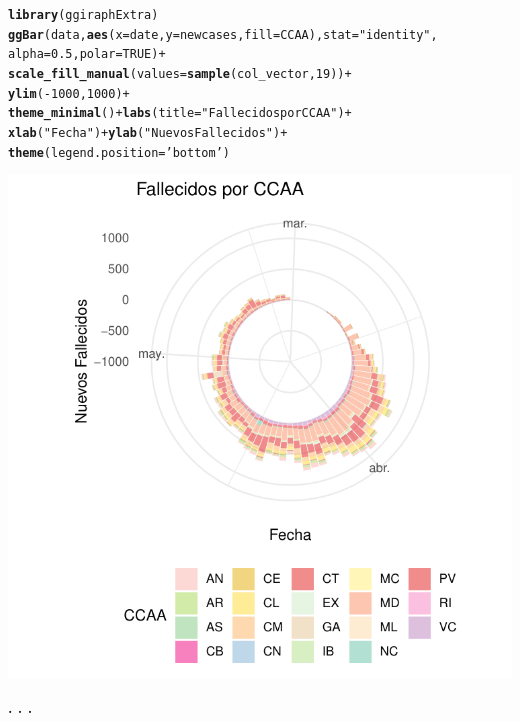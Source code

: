 \documentclass{article}\usepackage[]{graphicx}\usepackage[]{color}
\makeatletter
\def\maxwidth{ %
  \ifdim\Gin@nat@width>\linewidth
    \linewidth
  \else
    \Gin@nat@width
  \fi
}
\newcommand{\hlnum}[1]{\textcolor[rgb]{0.686,0.059,0.569}{#1}}%
\newcommand{\hlstr}[1]{\textcolor[rgb]{0.192,0.494,0.8}{#1}}%
\newcommand{\hlopt}[1]{\textcolor[rgb]{0,0,0}{#1}}%
\newcommand{\hlstd}[1]{\textcolor[rgb]{0.345,0.345,0.345}{#1}}%
\newcommand{\hlkwc}[1]{\textcolor[rgb]{0.333,0.667,0.333}{#1}}%
\newcommand{\hlkwd}[1]{\textcolor[rgb]{0.737,0.353,0.396}{\textbf{#1}}}%
\newenvironment{kframe}{%
 \def\at@end@of@kframe{}%
 \ifinner\ifhmode%
  \def\at@end@of@kframe{\end{minipage}}%
  \begin{minipage}{\columnwidth}%
 \fi\fi%
 \def\FrameCommand##1{\hskip\@totalleftmargin \hskip-\fboxsep
 \colorbox{shadecolor}{##1}\hskip-\fboxsep
     \hskip-\linewidth \hskip-\@totalleftmargin \hskip\columnwidth}%
 \MakeFramed {\advance\hsize-\width
   \@totalleftmargin\z@ \linewidth\hsize
   \@setminipage}}%
 {\par\unskip\endMakeFramed%
 \at@end@of@kframe}
\newenvironment{knitrout}{}{} %
\makeatother
\begin{document}
\begin{knitrout}
\color{fgcolor}\begin{kframe}
\begin{alltt}
\hlkwd{library}\hlstd{(ggiraphExtra)}
\hlkwd{ggBar}\hlstd{(data,} \hlkwd{aes}\hlstd{(}\hlkwc{x}\hlstd{=date,} \hlkwc{y}\hlstd{= newcases,} \hlkwc{fill} \hlstd{= CCAA),} \hlkwc{stat}\hlstd{=}\hlstr{"identity"}\hlstd{,}
      \hlkwc{alpha}\hlstd{=}\hlnum{0.5}\hlstd{,} \hlkwc{polar}\hlstd{=}\hlnum{TRUE}\hlstd{)} \hlopt{+}
  \hlkwd{scale_fill_manual}\hlstd{(}\hlkwc{values} \hlstd{=} \hlkwd{sample}\hlstd{(col_vector,} \hlnum{19}\hlstd{))} \hlopt{+}
  \hlkwd{ylim}\hlstd{(}\hlopt{-}\hlnum{1000}\hlstd{,}\hlnum{1000}\hlstd{)} \hlopt{+}
  \hlkwd{theme_minimal}\hlstd{()}\hlopt{+}\hlkwd{labs}\hlstd{(}\hlkwc{title} \hlstd{=} \hlstr{"Fallecidos por CCAA"}\hlstd{)} \hlopt{+}
        \hlkwd{xlab}\hlstd{(}\hlstr{"Fecha"}\hlstd{)}\hlopt{+}\hlkwd{ylab}\hlstd{(}\hlstr{"Nuevos Fallecidos"}\hlstd{)}\hlopt{+}
        \hlkwd{theme}\hlstd{(}\hlkwc{legend.position} \hlstd{=} \hlstr{'bottom'}\hlstd{)}
\end{alltt}
\end{kframe}

{\centering \includegraphics[width=\maxwidth]{figure/ggiraphExtra-1} 

}



\end{knitrout}
\begin{center}
\textbf{. . .}
\end{center}~\\
\end{document}
